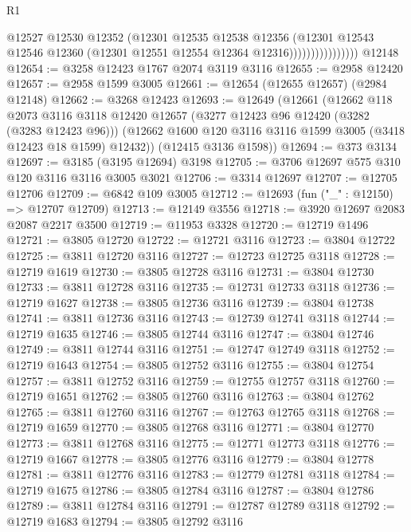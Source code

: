 \begin{lexlean}{R1}
\begin{coremodule}
                              @12527
                              @12530
                              @12352
                              (@12301
                                @12535
                                @12538
                                @12356
                                (@12301
                                  @12543
                                  @12546
                                  @12360
                                  (@12301 @12551 @12554 @12364 @12316))))))))))))))))
    @12148
@12654 := @3258 @12423 @1767 @2074 @3119 @3116
@12655 := @2958 @12420
@12657 := @2958 @1599 @3005
@12661 := @12654 (@12655 @12657) (@2984 @12148)
@12662 := @3268 @12423
@12693 := @12649
    (@12661
      (@12662
        @118
        @2073
        @3116
        @3118
        @12420
        @12657
        (@3277 @12423 @96 @12420 (@3282 (@3283 @12423 @96)))
        (@12662 @1600 @120 @3116 @3116 @1599 @3005 (@3418 @12423 @18 @1599) @12432))
      (@12415 @3136 @1598))
@12694 := @373 @3134
@12697 := @3185 (@3195 @12694) @3198
@12705 := @3706 @12697 @575 @310 @120 @3116 @3116 @3005 @3021
@12706 := @3314 @12697
@12707 := @12705 @12706
@12709 := @6842 @109 @3005
@12712 := @12693 (fun ("_" : @12150) => @12707 @12709)
@12713 := @12149 @3556
@12718 := @3920 @12697 @2083 @2087 @2217 @3500
@12719 := @11953 @3328
@12720 := @12719 @1496
@12721 := @3805 @12720
@12722 := @12721 @3116
@12723 := @3804 @12722
@12725 := @3811 @12720 @3116
@12727 := @12723 @12725 @3118
@12728 := @12719 @1619
@12730 := @3805 @12728 @3116
@12731 := @3804 @12730
@12733 := @3811 @12728 @3116
@12735 := @12731 @12733 @3118
@12736 := @12719 @1627
@12738 := @3805 @12736 @3116
@12739 := @3804 @12738
@12741 := @3811 @12736 @3116
@12743 := @12739 @12741 @3118
@12744 := @12719 @1635
@12746 := @3805 @12744 @3116
@12747 := @3804 @12746
@12749 := @3811 @12744 @3116
@12751 := @12747 @12749 @3118
@12752 := @12719 @1643
@12754 := @3805 @12752 @3116
@12755 := @3804 @12754
@12757 := @3811 @12752 @3116
@12759 := @12755 @12757 @3118
@12760 := @12719 @1651
@12762 := @3805 @12760 @3116
@12763 := @3804 @12762
@12765 := @3811 @12760 @3116
@12767 := @12763 @12765 @3118
@12768 := @12719 @1659
@12770 := @3805 @12768 @3116
@12771 := @3804 @12770
@12773 := @3811 @12768 @3116
@12775 := @12771 @12773 @3118
@12776 := @12719 @1667
@12778 := @3805 @12776 @3116
@12779 := @3804 @12778
@12781 := @3811 @12776 @3116
@12783 := @12779 @12781 @3118
@12784 := @12719 @1675
@12786 := @3805 @12784 @3116
@12787 := @3804 @12786
@12789 := @3811 @12784 @3116
@12791 := @12787 @12789 @3118
@12792 := @12719 @1683
@12794 := @3805 @12792 @3116

\end{coremodule}
\end{lexlean}
